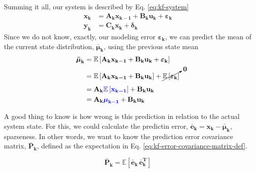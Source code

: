 \documentclass[12pt]{article}
\newcommand{\bvec}[1]{\boldsymbol{\mathbf{#1}}} %
\newcommand{\bvecT}[1]{\boldsymbol{\mathbf{#1^T}}} %
\newcommand{\mat}[1]{\boldsymbol{\mathbf{#1}}}
\newcommand{\brac}[1]{\left[#1\right]} %
\newcommand{\mb}[1]{{\boldsymbol{#1}}} %
\newcommand{\expv}[1]{\mathbb{E}\brac{#1}} %
\newcommand{\blue}[1]{\color{blue}#1\color{black}}
\begin{document}
Summing it all, our system is described by Eq. \ref{eq:kf-system}
\begin{equation}
    \begin{aligned}
        \bvec{x_k} &= \mat{A_k}\bvec{x_{k-1}} + \mat{B_k}\bvec{u_k} + \mb{\varepsilon}_\mathbf{k}\\
        \bvec{y_k} &= \mat{C_k}\bvec{x_k} + \mb{\delta}_\mathbf{k}
    \end{aligned}
    \label{eq:kf-system}
\end{equation}
Since we do not know, exactly, our modeling error $\mb{\varepsilon}_\mathbf{k}$, we can predict the mean of the current state distribution, $\mb{\bar{\mu}}_\mathbf{k}$, using the previous state mean
\begin{equation}
    \begin{aligned}
        \mb{\bar{\mu}}_\mathbf{k} &= \expv{\mat{A_k}\bvec{x_{k-1}} + \mat{B_k}\bvec{u_k} + \mb{\varepsilon}_\mathbf{k}}\\
        & = \expv{\mat{A_k}\bvec{x_{k-1}} + \mat{B_k}\bvec{u_k}} + \cancelto{\mat{0}}{\expv{\mb{\varepsilon}_\mathbf{k}}}\\
        &= \mat{A_k}\blue{\expv{\bvec{x_{k-1}}}} + \mat{B_k}\bvec{u_k}\\
        &= \mat{A_k}\blue{\mb{\mu}_\mathbf{k-1}} + \mat{B_k}\bvec{u_k}
    \end{aligned}
    \label{eq:kf-prdiction}
\end{equation}

A good thing to know is how wrong is this prediction in relation to the actual system state. For this, we could calculate the predictin error, $\bvec{\bar{e}_k} = \bvec{x_k} - \mb{\bar{\mu}}_\mathbf{k}$, sparseness. In other words, we want to know the prediction error covariance matrix, $\mat{\bar{P}_k}$, defined as the expectation in Eq. \ref{eq:kf-error-covariance-matrix-def}.

\begin{equation}
    \mat{\bar{P}_k} = \expv{\bvec{\bar{e}_k} \, \bvecT{\bar{e}_k}}
    \label{eq:kf-error-covariance-matrix-def}
\end{equation}
\end{document}
